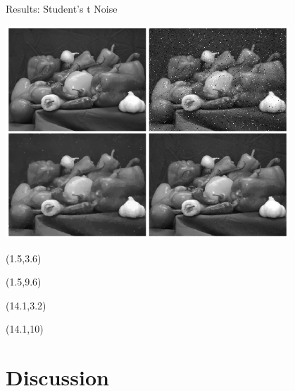 \documentclass[12pt]{beamer}
\begin{document}
\begin{frame}{Results: Student's t Noise}
\begin{center}
\vspace{-3 mm}
\includegraphics[width = 0.8\textwidth]{../figures/student-t_peppers.png} 
\end{center}

\begin{textblock}{5}(1.5,3.6)
\end{textblock}

\begin{textblock}{5}(1.5,9.6)
\end{textblock}

\begin{textblock}{5}(14.1,3.2)
\end{textblock}

\begin{textblock}{5}(14.1,10)
\end{textblock}

\end{frame}

\section{Discussion}
\end{document}
